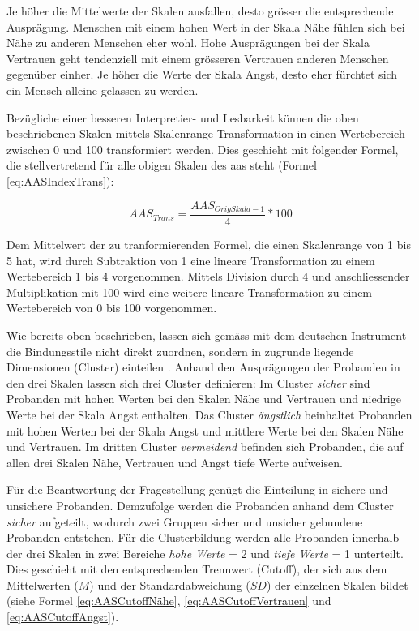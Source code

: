 Je höher die Mittelwerte der Skalen ausfallen, desto grösser die entsprechende Ausprägung. Menschen mit einem hohen Wert in der Skala Nähe fühlen sich bei Nähe zu anderen Menschen eher wohl. Hohe Ausprägungen bei der Skala Vertrauen geht tendenziell mit einem grösseren Vertrauen anderen Menschen gegenüber einher. Je höher die Werte der Skala Angst, desto eher fürchtet sich ein Mensch alleine gelassen zu werden.

Bezügliche einer besseren Interpretier- und Lesbarkeit können die oben beschriebenen Skalen mittels Skalenrange-Transformation in einen Wertebereich zwischen 0 und 100 transformiert werden. Dies geschieht mit folgender Formel, die stellvertretend für alle obigen Skalen des \acrshort{aas} steht (Formel \ref{eq:AASIndexTrans}):

\begin{equation}\label{eq:AASIndexTrans}
    AAS_{Trans}=\frac{AAS_{OrigSkala - 1}}{4}*100
\end{equation}

Dem Mittelwert der zu tranformierenden Formel, die einen Skalenrange von 1 bis 5 hat, wird durch Subtraktion von 1 eine lineare Transformation zu einem Wertebereich 1 bis 4 vorgenommen. Mittels Division durch 4 und anschliessender Multiplikation mit 100 wird eine weitere lineare Transformation zu einem Wertebereich von 0 bis 100 vorgenommen.

Wie bereits oben beschrieben, lassen sich gemäss  mit dem deutschen Instrument die Bindungsstile nicht direkt zuordnen, sondern in zugrunde liegende Dimensionen (Cluster) einteilen \cite{Schuetzmann2004}. Anhand den Ausprägungen der Probanden in den drei Skalen lassen sich drei Cluster definieren: Im Cluster \textit{sicher} sind Probanden mit hohen Werten bei den Skalen Nähe und Vertrauen und niedrige Werte bei der Skala Angst enthalten. Das Cluster \textit{ängstlich} beinhaltet Probanden mit hohen Werten bei der Skala Angst und mittlere Werte bei den Skalen Nähe und Vertrauen. Im dritten Cluster \textit{vermeidend} befinden sich Probanden, die auf allen drei Skalen Nähe, Vertrauen und Angst tiefe Werte aufweisen.

Für die Beantwortung der Fragestellung genügt die Einteilung in sichere und unsichere Probanden. Demzufolge werden die Probanden anhand dem Cluster \textit{sicher} aufgeteilt, wodurch zwei Gruppen sicher und unsicher gebundene Probanden entstehen. 
Für die Clusterbildung werden alle Probanden innerhalb der drei Skalen in zwei Bereiche \textit{hohe Werte} = 2 und \textit{tiefe Werte} = 1 unterteilt. Dies geschieht mit den entsprechenden Trennwert (Cutoff), der sich aus dem Mittelwerten ($M$) und der Standardabweichung ($SD$) der einzelnen Skalen bildet (siehe Formel \ref{eq:AASCutoffNähe}, \ref{eq:AASCutoffVertrauen} und \ref{eq:AASCutoffAngst}). 

